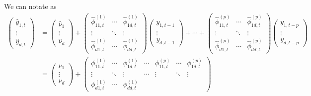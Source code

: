 \documentclass[fleqn]{article}
\begin{document}
We can notate as
\begin{align*}
    \begin{pmatrix}
        \hat{y}_{1, t} \\
        \vdots \\
        \hat{y}_{d, t}
    \end{pmatrix}
    &=
    \begin{pmatrix}
        \hat{\nu}_1 \\
        \vdots \\
        \hat{\nu}_d
    \end{pmatrix}
    +
    \begin{pmatrix}
        \hat{\phi}^{(1)}_{11, t} & \cdots & \hat{\phi}^{(1)}_{1d, t} \\
        \vdots & \ddots & \vdots \\
        \hat{\phi}^{(1)}_{d1, t} & \cdots & \hat{\phi}^{(1)}_{dd, t}
    \end{pmatrix}
    \begin{pmatrix}
        y_{1, t-1} \\
        \vdots \\
        y_{d, t-1}
    \end{pmatrix}
    + \cdots +
    \begin{pmatrix}
        \hat{\phi}^{(p)}_{11, t} & \cdots & \hat{\phi}^{(p)}_{1d, t} \\
        \vdots & \ddots & \vdots \\
        \hat{\phi}^{(p)}_{d1, t} & \cdots & \hat{\phi}^{(p)}_{dd, t}
    \end{pmatrix}
    \begin{pmatrix}
        y_{1, t-p} \\
        \vdots \\
        y_{d, t-p}
    \end{pmatrix}\\
    & =
    \begin{pmatrix}
        \nu_1 \\
        \vdots \\
        \nu_d
    \end{pmatrix}
    +
    \begin{pmatrix}
        \phi^{(1)}_{11, t} & \cdots & \phi^{(1)}_{1d, t}
        & \cdots &
        \phi^{(p)}_{11, t} & \cdots & \phi^{(p)}_{1d, t} \\
        \vdots & \ddots & \vdots
        & \cdots &
        \vdots & \ddots & \vdots \\
        \phi^{(1)}_{d1, t} & \cdots & \phi^{(1)}_{dd, t}

\end{pmatrix}
\end{align*}
\end{document}
